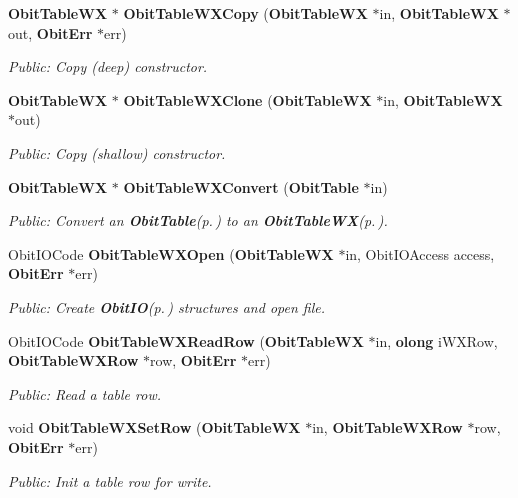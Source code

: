 \begin{CompactItemize}
{\bf Obit\-Table\-WX} $\ast$ {\bf Obit\-Table\-WXCopy} ({\bf Obit\-Table\-WX} $\ast$in, {\bf Obit\-Table\-WX} $\ast$out, {\bf Obit\-Err} $\ast$err)
\begin{CompactList}\small\item\em Public: Copy (deep) constructor. \item\end{CompactList}\item 
{\bf Obit\-Table\-WX} $\ast$ {\bf Obit\-Table\-WXClone} ({\bf Obit\-Table\-WX} $\ast$in, {\bf Obit\-Table\-WX} $\ast$out)
\begin{CompactList}\small\item\em Public: Copy (shallow) constructor. \item\end{CompactList}\item 
{\bf Obit\-Table\-WX} $\ast$ {\bf Obit\-Table\-WXConvert} ({\bf Obit\-Table} $\ast$in)
\begin{CompactList}\small\item\em Public: Convert an {\bf Obit\-Table}{\rm (p.\,\pageref{structObitTable})} to an {\bf Obit\-Table\-WX}{\rm (p.\,\pageref{structObitTableWX})}. \item\end{CompactList}\item 
Obit\-IOCode {\bf Obit\-Table\-WXOpen} ({\bf Obit\-Table\-WX} $\ast$in, Obit\-IOAccess access, {\bf Obit\-Err} $\ast$err)
\begin{CompactList}\small\item\em Public: Create {\bf Obit\-IO}{\rm (p.\,\pageref{structObitIO})} structures and open file. \item\end{CompactList}\item 
Obit\-IOCode {\bf Obit\-Table\-WXRead\-Row} ({\bf Obit\-Table\-WX} $\ast$in, {\bf olong} i\-WXRow, {\bf Obit\-Table\-WXRow} $\ast$row, {\bf Obit\-Err} $\ast$err)
\begin{CompactList}\small\item\em Public: Read a table row. \item\end{CompactList}\item 
void {\bf Obit\-Table\-WXSet\-Row} ({\bf Obit\-Table\-WX} $\ast$in, {\bf Obit\-Table\-WXRow} $\ast$row, {\bf Obit\-Err} $\ast$err)
\begin{CompactList}\small\item\em Public: Init a table row for write. \item\end{CompactList}\item 

\end{CompactItemize}
